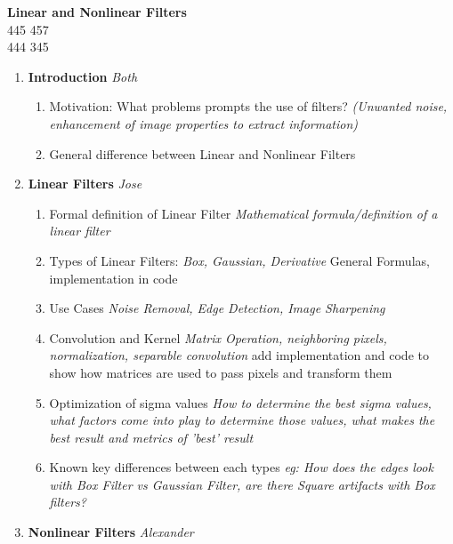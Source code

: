 \documentclass[titlepage]{article}
\begin{document}
    
    \begin{center} 
        \textbf{\LARGE{Linear and Nonlinear Filters}}\\
        \large{} 445 457\\
         444 345
    \end{center}
    \large\begin{enumerate}[label=\Roman*.]
        \item \textbf{Introduction} \emph{Both}
            \begin{enumerate}[label=\arabic*.]
                \item Motivation: What problems prompts the use of filters?
                    \textit{(Unwanted noise, enhancement of image properties to extract information)}
                \item General difference between Linear and Nonlinear Filters
            \end{enumerate}
        \item \textbf{Linear Filters} \emph{Jose}
            \begin{enumerate}[label=\arabic*.]
                \item Formal definition of Linear Filter \textit{Mathematical formula/definition of a linear filter}
                \item Types of Linear Filters: \textit{Box, Gaussian, Derivative} General Formulas, implementation in code
                \item Use Cases \textit{ Noise Removal, Edge Detection, Image Sharpening}
                \item Convolution and Kernel \textit{Matrix Operation, neighboring pixels, normalization, separable convolution}
                    add implementation and code to show how matrices are used to pass pixels and transform them
                \item Optimization of sigma values \textit{How to determine the best sigma values,
                    what factors come into play to determine those values, what makes the best result and metrics of 'best' result}
                \item Known key differences between each types \textit{eg: How does the edges look with Box Filter vs Gaussian Filter, are there Square artifacts
                with Box filters?}
            \end{enumerate}
        \item \textbf{Nonlinear Filters} \emph{Alexander}

\end{enumerate}
\end{document}
